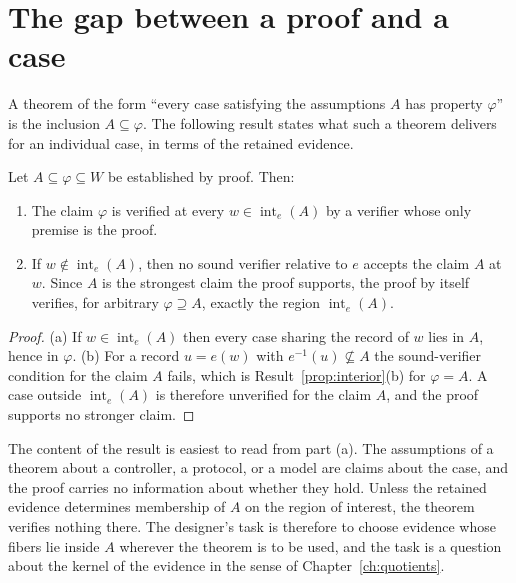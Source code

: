 \section{The gap between a proof and a case}

A theorem of the form ``every case satisfying the assumptions $A$ has property $\varphi$'' is the inclusion $A\subseteq\varphi$. The following result states what such a theorem delivers for an individual case, in terms of the retained evidence.

\begin{newresult}\label{prop:gap}
Let $A\subseteq\varphi\subseteq W$ be established by proof. Then:
\begin{enumerate}[nosep,label=(\alph*)]
  \item The claim $\varphi$ is verified at every $w\in\operatorname{int}_e(A)$ by a verifier whose only premise is the proof.
  \item If $w\notin\operatorname{int}_e(A)$, then no sound verifier relative to $e$ accepts the claim $A$ at $w$. Since $A$ is the strongest claim the proof supports, the proof by itself verifies, for arbitrary $\varphi\supseteq A$, exactly the region $\operatorname{int}_e(A)$.
\end{enumerate}
\end{newresult}
\begin{proof}
(a) If $w\in\operatorname{int}_e(A)$ then every case sharing the record of $w$ lies in $A$, hence in $\varphi$. (b) For a record $u=e(w)$ with $e^{-1}(u)\not\subseteq A$ the sound-verifier condition for the claim $A$ fails, which is Result~\ref{prop:interior}(b) for $\varphi=A$. A case outside $\operatorname{int}_e(A)$ is therefore unverified for the claim $A$, and the proof supports no stronger claim.
\end{proof}

The content of the result is easiest to read from part (a). The assumptions of a theorem about a controller, a protocol, or a model are claims about the case, and the proof carries no information about whether they hold. Unless the retained evidence determines membership of $A$ on the region of interest, the theorem verifies nothing there. The designer's task is therefore to choose evidence whose fibers lie inside $A$ wherever the theorem is to be used, and the task is a question about the kernel of the evidence in the sense of Chapter~\ref{ch:quotients}.


